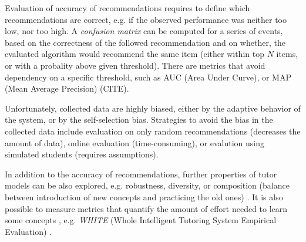 Evaluation of accuracy of recommendations requires to define which
recommendations are correct, e.g. if the observed performance was neither too
low, nor too high.
A \emph{confusion matrix} can be computed for a series of events,
based on the correctness of the followed recommendation and on whether, the
evaluated algorithm would recommend the same item
(either within top $N$ items, or with a probality above given threshold).
There are metrics that avoid dependency on a specific threshold, such as
AUC (Area Under Curve), or MAP (Mean Average Precision) (CITE).  %

Unfortunately, collected data are highly biased, either by the
adaptive behavior of the system, or by the self-selection bias. %
Strategies to avoid the bias in the collected data include
evaluation on only random recommendations (decreases the amount of data),
online evaluation (time-consuming),
or evalution using simulated students (requires assumptions).


In addition to the accuracy of recommendations, %
further properties of tutor models can be also explored,
e.g. robustness, diversity, %
or composition (balance between introduction of new concepts and practicing the old ones)
\cite{progression-analysis}.  %
It is also possible to measure metrics that quantify the amount of effort needed
to learn some concepts , e.g. \emph{WHITE} (Whole Intelligent Tutoring System Empirical Evaluation) \cite{evaluation-leopard}.  %

